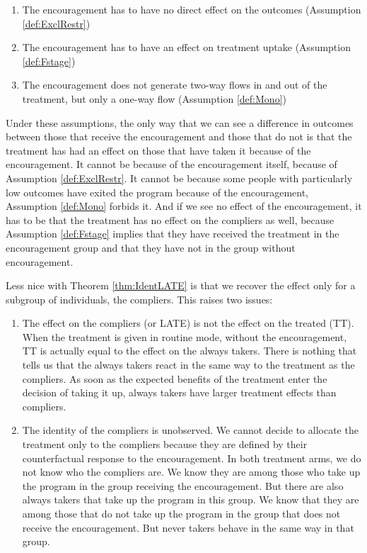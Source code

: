 \documentclass[]{book}
\providecommand{\tightlist}{%
  \setlength{\itemsep}{0pt}\setlength{\parskip}{0pt}}
\theoremstyle{definition}
\theoremstyle{definition}
\theoremstyle{definition}
\theoremstyle{remark}
\let\BeginKnitrBlock\begin \let\EndKnitrBlock\end
\begin{document}
\begin{enumerate}
\def\labelenumi{\arabic{enumi}.}
\tightlist
\item
  The encouragement has to have no direct effect on the outcomes (Assumption \ref{def:ExclRestr})
\item
  The encouragement has to have an effect on treatment uptake (Assumption \ref{def:Fstage})
\item
  The encouragement does not generate two-way flows in and out of the treatment, but only a one-way flow (Assumption \ref{def:Mono})
\end{enumerate}

Under these assumptions, the only way that we can see a difference in outcomes between those that receive the encouragement and those that do not is that the treatment has had an effect on those that have taken it because of the encouragement.
It cannot be because of the encouragement itself, because of Assumption \ref{def:ExclRestr}.
It cannot be because some people with particularly low outcomes have exited the program because of the encouragement, Assumption \ref{def:Mono} forbids it.
And if we see no effect of the encouragement, it has to be that the treatment has no effect on the compliers as well, because Assumption \ref{def:Fstage} implies that they have received the treatment in the encouragement group and that they have not in the group without encouragement.

\BeginKnitrBlock{remark}
\iffalse{} {Remark. } \fi{}Less nice with Theorem \ref{thm:IdentLATE} is that we recover the effect only for a subgroup of individuals, the compliers.
This raises two issues:
\EndKnitrBlock{remark}

\begin{enumerate}
\def\labelenumi{\arabic{enumi}.}
\tightlist
\item
  The effect on the compliers (or LATE) is not the effect on the treated (TT).
  When the treatment is given in routine mode, without the encouragement, TT is actually equal to the effect on the always takers.
  There is nothing that tells us that the always takers react in the same way to the treatment as the compliers.
  As soon as the expected benefits of the treatment enter the decision of taking it up, always takers have larger treatment effects than compliers.
\item
  The identity of the compliers is unobserved.
  We cannot decide to allocate the treatment only to the compliers because they are defined by their counterfactual response to the encouragement.
  In both treatment arms, we do not know who the compliers are.
  We know they are among those who take up the program in the group receiving the encouragement.
  But there are also always takers that take up the program in this group.
  We know that they are among those that do not take up the program in the group that does not receive the encouragement.
  But never takers behave in the same way in that group.
\end{enumerate}
\end{document}
